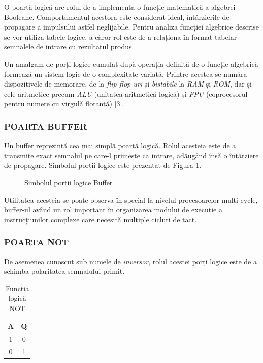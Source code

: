 \documentclass[12pt]{article}
\begin{document}
O poartă logică are rolul de a implementa o funcție matematică a algebrei Booleane. Comportamentul acestora este considerat ideal, întârzierile de propagare a impulsului astfel neglijabile. Pentru analiza funcției algebrice descrise se vor utiliza  tabele logice, a căror rol este de a relaționa în format tabelar semnalele de intrare cu rezultatul produs.

Un amalgam de porți logice cumulat după operația definită de o funcție algebrică formează un sistem logic de o complexitate variată. Printre acestea se număra dispozitivele de memorare, de la \textit{flip-flop-uri} și \textit{bistabile} la \textit{RAM} și \textit{ROM}, dar și cele aritmetice precum \textit{ALU} (unitatea aritmetică logică) și \textit{FPU} (coprocesorul pentru numere cu virgulă flotantă) [3].


\subsubsection{POARTA BUFFER}
Un buffer reprezintă cea mai simplă poartă logică. Rolul acesteia este de a transmite exact semnalul pe care-l primește ca intrare, adăugând însă o întârziere de propagare. Simbolul porții logice este prezentat de Figura \ref{Figura:4}.

 \begin{figure}[h!]
 \centering
 \caption{Simbolul porții logice Buffer}
 \label{Figura:4}
\end{figure}
 
 Utilitatea acesteia se poate observa în special la nivelul procesoarelor  multi-cycle, buffer-ul având un rol important în organizarea modului de execuție a instrucțiunilor complexe care necesită multiple cicluri de tact. 
 
\subsubsection{POARTA NOT}
De asemenea cunoscut sub numele de \textit{inversor}, rolul acestei porți logice este 
de a schimba polaritatea semnalului primit.
 
 \begin{table}[h]
\centering
\begin{tabular}{ ||c|c|| }
 \hline
 A & Q\\ 
 \hline  \hline
 1 & 0 \\
 \hline
 0 & 1 \\
 \hline
\end{tabular}
\caption{Funcția logică NOT}
\label{Tabela:7}
\end{table}
\end{document}
